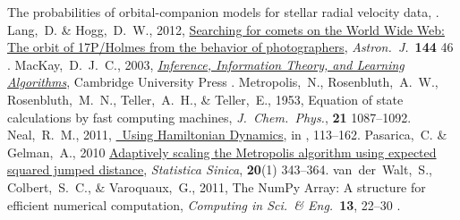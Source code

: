 \documentclass[12pt,twoside,pdftex]{article}
\newcommand{\MCMC}{\acronym{MCMC}}
\begin{document}
\begin{thebibliography}{}
  The probabilities of orbital-companion models for stellar radial velocity data,
  .
  Lang,~D. \& Hogg,~D.~W., 2012,
  \href{http://adsabs.harvard.edu/abs/2012AJ....144...46L}{Searching for comets on the World Wide Web:
    The orbit of 17P/Holmes from the behavior of photographers},
  \textit{Astron.\ J.}\ \textbf{144} 46
  .
  MacKay,~D.~J.~C., 2003,
  \href{http://www.inference.phy.cam.ac.uk/mackay/itila/book.html}{\textit{Inference, Information Theory, and Learning Algorithms}},
  Cambridge University Press
  .
  Metropolis,~N., Rosenbluth,~A.~W., Rosenbluth,~M.~N., Teller,~A.~H., \& Teller,~E., 1953,
  Equation of state calculations by fast computing machines,
  \textit{J.\ Chem.\ Phys.}, \textbf{21} 1087--1092.
  Neal,~R.~M., 2011,
  \href{http://www.mcmchandbook.net/HandbookChapter5.pdf}{\MCMC\ Using Hamiltonian Dynamics},
  in \citet{mcmchandbook}, 113--162.
  Pasarica,~C. \& Gelman,~A., 2010
  \href{http://www.jstor.org/stable/24308995}{Adaptively scaling the Metropolis algorithm using expected squared jumped distance},
  \textit{Statistica Sinica}, \textbf{20}(1) 343--364.
  van~der~Walt,~S., Colbert,~S.~C., \& Varoquaux,~G., 2011,
  The NumPy Array: A structure for efficient numerical computation,
  \textit{Computing in Sci.\ \& Eng.}\ \textbf{13}, 22--30
  .
\end{thebibliography}
\end{document}
